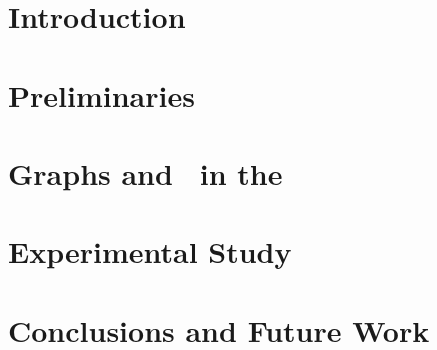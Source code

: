 \documentclass[12pt, openany]{book}
\begin{document}




\chapter{Introduction \label{chap:intro}}

\chapter{Preliminaries \label{chap:preliminaries}}

\chapter{Graphs and \msts\ in the \dpm\ \label{chap:dpmst}}

\chapter{Experimental Study \label{chap:experiments}}

\chapter{Conclusions and Future Work\label{chap:conclusion}}


\newpage
{}
\printbibliography

\newpage


\end{document}
